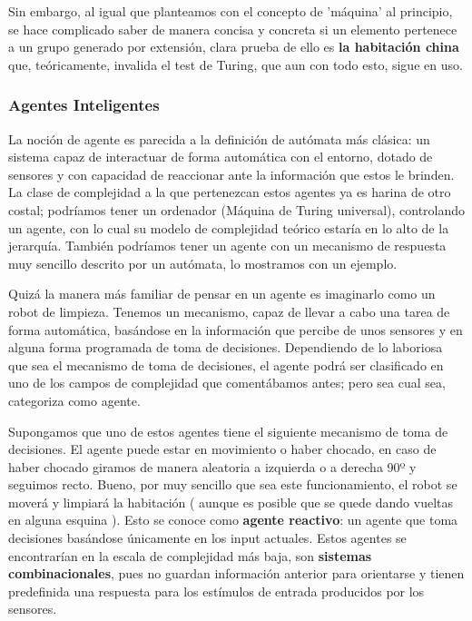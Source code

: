 \vspace{10px}

Sin embargo, al igual que planteamos con el concepto de 'máquina' al principio, se hace complicado saber de manera concisa y concreta si un elemento pertenece a un grupo generado por extensión, clara prueba de ello es \textbf{la habitación china} que, teóricamente, invalida el test de Turing, que aun con todo esto, sigue en uso.

\subsubsection{Agentes Inteligentes}


La noción de agente es parecida a la definición de autómata más clásica: un sistema capaz de interactuar de forma automática con el entorno, dotado de sensores y con capacidad de reaccionar ante la información que estos le brinden. La clase de complejidad a la que pertenezcan estos agentes ya es harina de otro costal; podríamos tener un ordenador (Máquina de Turing universal), controlando un agente, con lo cual su modelo de complejidad teórico estaría en lo alto de la jerarquía. También podríamos tener un agente con un mecanismo de respuesta muy sencillo descrito por un autómata, lo mostramos con un ejemplo.


\vspace{10px}

Quizá la manera más familiar de pensar en un agente es imaginarlo como un robot de limpieza. Tenemos un mecanismo, capaz de llevar a cabo una tarea de forma automática, basándose en la información que percibe de unos sensores y en alguna forma programada de toma de decisiones. Dependiendo de lo laboriosa que sea el mecanismo de toma de decisiones, el agente podrá ser clasificado en uno de los campos de complejidad que comentábamos antes; pero sea cual sea, categoriza como agente.

\vspace{10px}

Supongamos que uno de estos agentes tiene el siguiente mecanismo de toma de decisiones. El agente puede estar en movimiento o haber chocado, en caso de haber chocado giramos de manera aleatoria a izquierda o a derecha 90º y seguimos recto. Bueno, por muy sencillo que sea este funcionamiento, el robot se moverá y limpiará la habitación ( aunque es posible que se quede dando vueltas en alguna esquina ). Esto se conoce como \textbf{agente reactivo}: un agente que toma decisiones basándose únicamente en los input actuales. Estos agentes se encontrarían en la escala de complejidad más baja, son \textbf{sistemas combinacionales}, pues no guardan información anterior para orientarse y tienen predefinida una respuesta para los estímulos de entrada producidos por los sensores.


